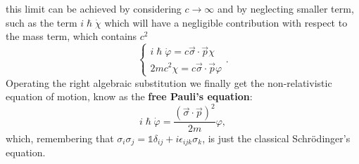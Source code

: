 this limit can be achieved by considering $c\rightarrow\infty$ and by neglecting smaller term, such as the term $i\hslash\dot\chi$ which will have a negligible contribution with respect to the mass term, which contains $c^2$
\begin{equation*}
    \begin{cases}
        i\hslash\dot\varphi=c\vec\sigma\cdot\vec p\chi\\
        2mc^2\chi=c\vec\sigma\cdot\vec p\varphi
    \end{cases}.
\end{equation*}
Operating the right algebraic substitution we finally get the non-relativistic equation of motion, know as the \textbf{free Pauli's equation}:
\begin{equation*}
    i\hslash\dot\varphi =\frac{(\vec\sigma\cdot\vec p)^2}{2m}\varphi,
\end{equation*}
which, remembering that $\sigma_i\sigma_j=\mathds{1}\delta_{ij}+i\epsilon_{ijk}\sigma_k$, is just the classical Schrödinger's equation.\\

